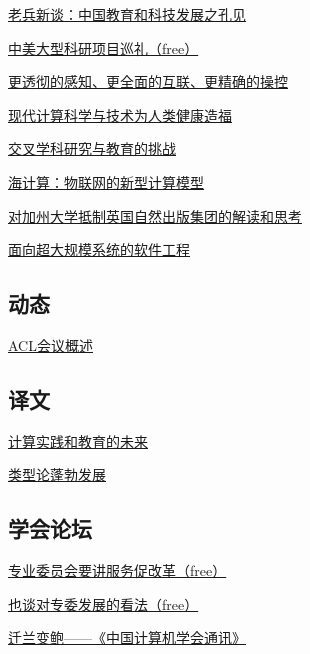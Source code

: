 \documentclass[a4paper]{article}
\begin{document}
\href{http://history.ccf.org.cn/resources/1190201776262/2010/07/15/201007-8.pdf}{老兵新谈：中国教育和科技发展之孔见}

\href{http://history.ccf.org.cn/resources/1190201776262/2010/07/15/201007-9.pdf}{中美大型科研项目巡礼（free）}

\href{http://history.ccf.org.cn/resources/1190201776262/2010/07/15/201007-10.pdf}{更透彻的感知、更全面的互联、更精确的操控}

\href{http://history.ccf.org.cn/resources/1190201776262/2010/07/15/201007-11.pdf}{现代计算科学与技术为人类健康造福}

\href{http://history.ccf.org.cn/resources/1190201776262/2010/07/15/201007-12.pdf}{交叉学科研究与教育的挑战}

\href{http://history.ccf.org.cn/resources/1190201776262/2010/07/15/201007-13.pdf}{海计算：物联网的新型计算模型}

\href{http://history.ccf.org.cn/resources/1190201776262/2010/07/15/201007-14.pdf}{对加州大学抵制英国自然出版集团的解读和思考}

\href{http://history.ccf.org.cn/resources/1190201776262/2010/07/15/201007-15.pdf}{面向超大规模系统的软件工程}

\subsection{动态}
\href{http://history.ccf.org.cn/resources/1190201776262/2010/07/15/201007-16.pdf}{ACL会议概述}

\subsection{译文}
\href{http://history.ccf.org.cn/resources/1190201776262/2010/07/15/201007-17.pdf}{计算实践和教育的未来}

\href{http://history.ccf.org.cn/resources/1190201776262/2010/07/15/2010.7 xiao-18.pdf}{类型论蓬勃发展}

\subsection{学会论坛}
\href{http://history.ccf.org.cn/resources/1190201776262/2010/07/15/201007-20.pdf}{专业委员会要讲服务促改革（free）}

\href{http://history.ccf.org.cn/resources/1190201776262/2010/07/15/201007-21.pdf}{也谈对专委发展的看法（free）}

\href{http://history.ccf.org.cn/resources/1190201776262/2010/07/15/201007-19.pdf}{迁兰变鲍——《中国计算机学会通讯》}
\end{document}
